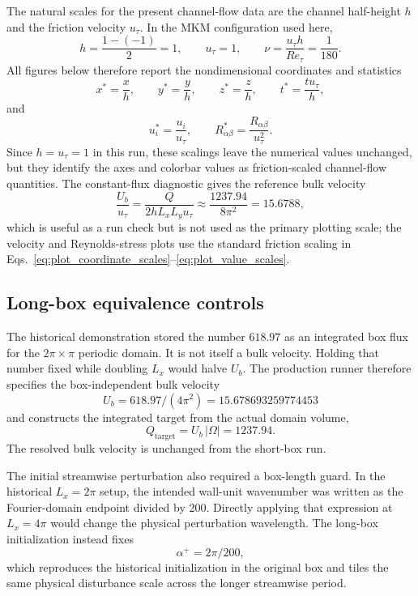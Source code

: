 \documentclass[11pt]{article}
\begin{document}
The natural scales for the present channel-flow data are the channel
half-height \(h\) and the friction velocity \(u_{\tau}\). In the MKM
configuration used here,
\[
  h=\frac{1-(-1)}{2}=1,\qquad u_{\tau}=1,\qquad
  \nu=\frac{u_{\tau}h}{Re_{\tau}}=\frac{1}{180}.
\]
All figures below therefore report the nondimensional coordinates and
statistics
\begin{equation}
  x^*=\frac{x}{h},\qquad y^*=\frac{y}{h},\qquad
  z^*=\frac{z}{h},\qquad t^*=\frac{t u_{\tau}}{h},
  \label{eq:plot_coordinate_scales}
\end{equation}
and
\begin{equation}
  u_i^*=\frac{u_i}{u_{\tau}},\qquad
  R_{\alpha\beta}^*=\frac{R_{\alpha\beta}}{u_{\tau}^2}.
  \label{eq:plot_value_scales}
\end{equation}
Since \(h=u_{\tau}=1\) in this run, these scalings leave the numerical values
unchanged, but they identify the axes and colorbar values as friction-scaled
channel-flow quantities. The constant-flux diagnostic gives the reference bulk
velocity
\begin{equation}
  \frac{U_b}{u_{\tau}}
  =
  \frac{Q}{2hL_xL_yu_{\tau}}
  \approx
  \frac{1237.94}{8\pi^2}
  =
  15.6788,
  \label{eq:bulk_velocity_reference}
\end{equation}
which is useful as a run check but is not used as the primary plotting scale;
the velocity and Reynolds-stress plots use the standard friction scaling in
Eqs.~\eqref{eq:plot_coordinate_scales}--\eqref{eq:plot_value_scales}.

\subsection{Long-box equivalence controls}

The historical demonstration stored the number \(618.97\) as an integrated
box flux for the \(2\pi\times\pi\) periodic domain. It is not itself a bulk
velocity. Holding that number fixed while doubling \(L_x\) would halve
\(U_b\). The production runner therefore specifies the box-independent bulk
velocity
\[
  U_b=618.97/(4\pi^2)=15.678693259774453
\]
and constructs the integrated target from the actual domain volume,
\begin{equation}
  Q_{\mathrm{target}}=U_b\,|\Omega|=1237.94.
  \label{eq:longbox_flux_scaling}
\end{equation}
The resolved bulk velocity is unchanged from the short-box run.

The initial streamwise perturbation also required a box-length guard. In the
historical \(L_x=2\pi\) setup, the intended wall-unit wavenumber was written as
the Fourier-domain endpoint divided by 200. Directly applying that expression
at \(L_x=4\pi\) would change the physical perturbation wavelength. The
long-box initialization instead fixes
\begin{equation}
  \alpha^+=2\pi/200,
  \label{eq:longbox_initial_alpha}
\end{equation}
which reproduces the historical initialization in the original box and tiles
the same physical disturbance scale across the longer streamwise period.
\end{document}
